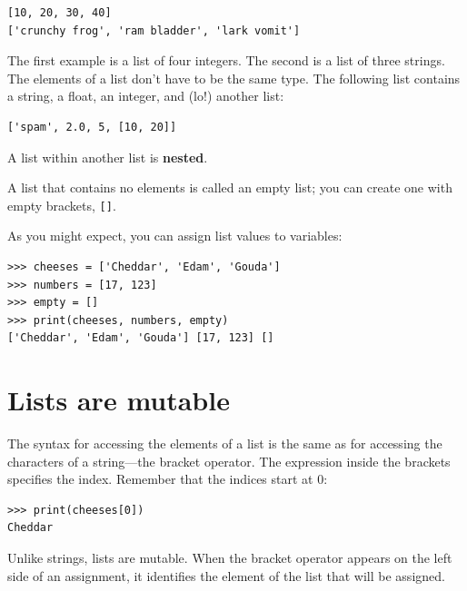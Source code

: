 \documentclass[10pt]{book}
\begin{document}
\beforeverb
\begin{verbatim}
[10, 20, 30, 40]
['crunchy frog', 'ram bladder', 'lark vomit']
\end{verbatim}
\afterverb
%
The first example is a list of four integers.  The second is a list of
three strings.  The elements of a list don't have to be the same type.
The following list contains a string, a float, an integer, and
(lo!) another list:

\beforeverb
\begin{verbatim}
['spam', 2.0, 5, [10, 20]]
\end{verbatim}
\afterverb
%
A list within another list is {\bf nested}.


A list that contains no elements is
called an empty list; you can create one with empty
brackets, \verb"[]".


As you might expect, you can assign list values to variables:

\beforeverb
\begin{verbatim}
>>> cheeses = ['Cheddar', 'Edam', 'Gouda']
>>> numbers = [17, 123]
>>> empty = []
>>> print(cheeses, numbers, empty)
['Cheddar', 'Edam', 'Gouda'] [17, 123] []
\end{verbatim}
\afterverb
%




\section{Lists are mutable}


The syntax for accessing the elements of a list is the same as for
accessing the characters of a string---the bracket operator.  The
expression inside the brackets specifies the index.  Remember that the
indices start at 0:

\beforeverb
\begin{verbatim}
>>> print(cheeses[0])
Cheddar
\end{verbatim}
\afterverb
%
Unlike strings, lists are mutable.  When the bracket operator appears
on the left side of an assignment, it identifies the element of the
list that will be assigned.
\end{document}
